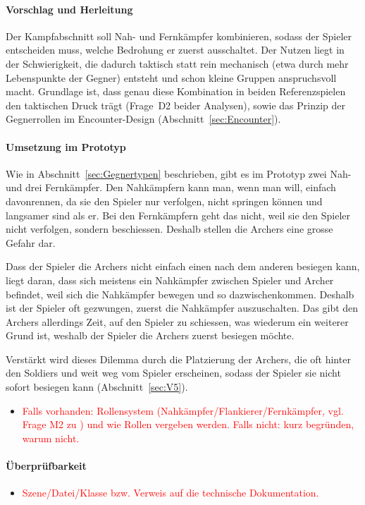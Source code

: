 \documentclass[../Main.tex]{subfiles}
\begin{document}
\paragraph{Vorschlag und Herleitung}
Der Kampfabschnitt soll Nah- und Fernkämpfer kombinieren, sodass der Spieler entscheiden muss, welche Bedrohung er zuerst ausschaltet. Der Nutzen liegt in der Schwierigkeit, die dadurch taktisch statt rein mechanisch (etwa durch mehr Lebenspunkte der Gegner) entsteht und schon kleine Gruppen anspruchsvoll macht. Grundlage ist, dass genau diese Kombination in beiden Referenzspielen den taktischen Druck trägt (Frage~D2 beider Analysen), sowie das Prinzip der Gegnerrollen im Encounter-Design (Abschnitt~\ref{sec:Encounter}).

\paragraph{Umsetzung im Prototyp}
Wie in Abschnitt~\ref{sec:Gegnertypen} beschrieben, gibt es im Prototyp zwei Nah- und drei Fernkämpfer. Den Nahkämpfern kann man, wenn man will, einfach davonrennen, da sie den Spieler nur verfolgen, nicht springen können und langsamer sind als er. Bei den Fernkämpfern geht das nicht, weil sie den Spieler nicht verfolgen, sondern beschiessen. Deshalb stellen die Archers eine grosse Gefahr dar.

Dass der Spieler die Archers nicht einfach einen nach dem anderen besiegen kann, liegt daran, dass sich meistens ein Nahkämpfer zwischen Spieler und Archer befindet, weil sich die Nahkämpfer bewegen und so dazwischenkommen. Deshalb ist der Spieler oft gezwungen, zuerst die Nahkämpfer auszuschalten. Das gibt den Archers allerdings Zeit, auf den Spieler zu schiessen, was wiederum ein weiterer Grund ist, weshalb der Spieler die Archers zuerst besiegen möchte.

Verstärkt wird dieses Dilemma durch die Platzierung der Archers, die oft hinter den Soldiers und weit weg vom Spieler erscheinen, sodass der Spieler sie nicht sofort besiegen kann (Abschnitt~\ref{sec:V5}).

\begin{itemize}[leftmargin=1.5cm]
    \item \textcolor{red}{Falls vorhanden: Rollensystem (Nahkämpfer/Flankierer/Fernkämpfer, vgl. Frage M2 zu ) und wie Rollen vergeben werden. Falls nicht: kurz begründen, warum nicht.}
\end{itemize}

\paragraph{Überprüfbarkeit}
\begin{itemize}[leftmargin=1.5cm]
    \item \textcolor{red}{Szene/Datei/Klasse bzw. Verweis auf die technische Dokumentation.}
\end{itemize}
\end{document}
